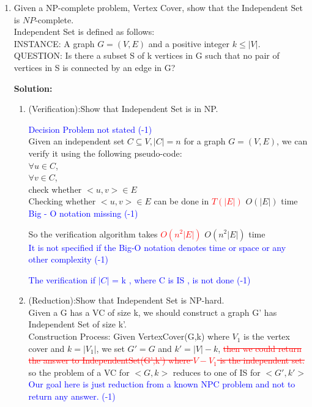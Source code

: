 \documentclass{article}%
\newcommand{\add}[1]{\textcolor{dkgreen}{#1}}
\newcommand{\rmv}[1]{\textcolor{red}{\sout{#1}}}
\newcommand{\moveto}[1]{\textcolor{blue}{#1}}
\begin{document}
\begin{enumerate}

  \item Given a NP-complete problem, Vertex Cover, show that the Independent Set is $NP$-complete.\\
  Independent Set is defined as follows:\\
  INSTANCE: A graph $G=(V,E)$ and a positive integer $k \leq |V|$.\\
  QUESTION: Is there a subset S of k vertices in G such that no pair of vertices in S is connected by an edge in G?
    
\textbf{Solution:}
\begin{enumerate}
	\item (Verification):Show that Independent Set is in NP.

   \moveto{Decision Problem not stated   (-1)}
	\\ Given an independent set $C\subseteq V, |C|=n$ for a graph $G=(V,E)$, we can verify it using the following pseudo-code: \\
	
		$\forall u \in C$, \\
	\hspace*{0.2in}$\forall v \in C$, \\
	\hspace*{0.4in}check whether $<u,v> \in E$ \\
   
	Checking whether $<u,v> \in E$ can be done in \rmv{$T(|E|)$ }\add{$O(|E|)$ time }   \\  
   \moveto{Big - O notation missing   (-1)}

   So the verification algorithm takes \rmv{$O(n^{2}|E|)$}  
   \add{$O(n^{2}|E|)$ time } \\
   \moveto{It is not specified if the Big-O notation denotes time or space or any other complexity   (-1)}
   
	 \moveto{The verification if $|C|$ = k , where C is IS , is not done   (-1)}
%	
	
	\item (Reduction):Show that Independent Set is NP-hard.
	\\Given a G has a VC of size k, we should construct a graph G' has Independent Set of size k'.
	\\Construction Process: Given VertexCover(G,k) where $V_{1}$ is the vertex cover and $k=|V_{1}|$, we set $G'=G$ and $k'=|V|-k$,\rmv { then we could return the answer to IndependentSet(G',k') where $V-V_{1}$ is the independent set.} \\
\add{so the problem of a VC for $<G,k>$ reduces to one of IS for $<G',k'>$} \\
 \moveto {Our goal here is just reduction from a known NPC problem and not to return any answer.   (-1)}
 

\end{enumerate}
\end{enumerate}
\end{document}
